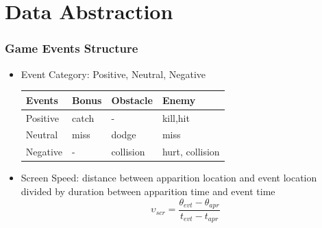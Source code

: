 \documentclass{beamer}
\begin{document}
\section{Data Abstraction}
\begin{frame}
\frametitle{Game Events Structure}
\begin{itemize}
\item Event Category: Positive, Neutral, Negative
\begin{table}[h]
\begin{center}
    \begin{tabular}{| l | l | l | l |}
    \hline
    Events & Bonus & Obstacle & Enemy \\ \hline
    Positive & catch & - & kill,hit\\ \hline
    Neutral & miss & dodge & miss\\ \hline
    Negative & - & collision & hurt, collision\\
    \hline
    \end{tabular}
    \label{tblEventType}
\end{center}
\end{table}
\item Screen Speed: distance between apparition location and event location divided by duration between apparition time and event time
$$ \upsilon_{scr} = \frac{\theta_{evt}-\theta_{apr}}{\textit{t}_{evt}-\textit{t}_{apr}} $$
\end{itemize}
\end{frame}
\end{document}
